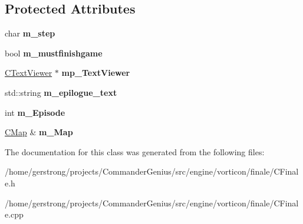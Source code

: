 \subsection*{Protected Attributes}
\begin{DoxyCompactItemize}
\item 
\hypertarget{class_c_finale_a475e9de9f986e29cd19d49771845c935}{
char {\bfseries m\_\-step}}
\label{class_c_finale_a475e9de9f986e29cd19d49771845c935}

\item 
\hypertarget{class_c_finale_a958f4f69b62e056f53b2d0338a8b0847}{
bool {\bfseries m\_\-mustfinishgame}}
\label{class_c_finale_a958f4f69b62e056f53b2d0338a8b0847}

\item 
\hypertarget{class_c_finale_a659f7e5c7c96fa4a62f2c0d30fb8d7cb}{
\hyperlink{class_c_text_viewer}{CTextViewer} $\ast$ {\bfseries mp\_\-TextViewer}}
\label{class_c_finale_a659f7e5c7c96fa4a62f2c0d30fb8d7cb}

\item 
\hypertarget{class_c_finale_aa32a22140d13a97062ea6a21008d8607}{
std::string {\bfseries m\_\-epilogue\_\-text}}
\label{class_c_finale_aa32a22140d13a97062ea6a21008d8607}

\item 
\hypertarget{class_c_finale_a6248596d1807414dec0101a6470660b4}{
int {\bfseries m\_\-Episode}}
\label{class_c_finale_a6248596d1807414dec0101a6470660b4}

\item 
\hypertarget{class_c_finale_a61d7fb6e84b6523e647441f1fa2142fc}{
\hyperlink{class_c_map}{CMap} \& {\bfseries m\_\-Map}}
\label{class_c_finale_a61d7fb6e84b6523e647441f1fa2142fc}

\end{DoxyCompactItemize}


The documentation for this class was generated from the following files:\begin{DoxyCompactItemize}
\item 
/home/gerstrong/projects/CommanderGenius/src/engine/vorticon/finale/CFinale.h\item 
/home/gerstrong/projects/CommanderGenius/src/engine/vorticon/finale/CFinale.cpp\end{DoxyCompactItemize}
